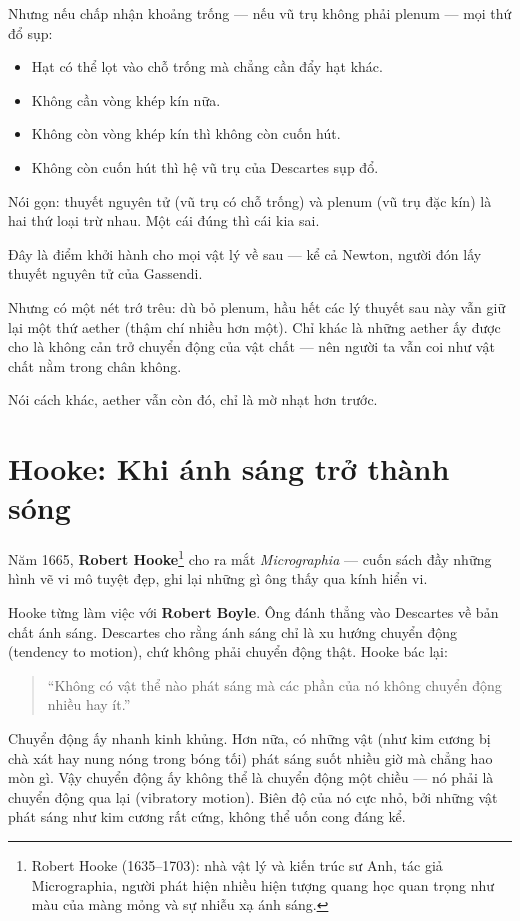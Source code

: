 Nhưng nếu chấp nhận khoảng trống — nếu vũ trụ không phải plenum — mọi thứ đổ sụp:

\begin{itemize}
  \item Hạt có thể lọt vào chỗ trống mà chẳng cần đẩy hạt khác.
  \item Không cần vòng khép kín nữa.
  \item Không còn vòng khép kín thì không còn cuốn hút.
  \item Không còn cuốn hút thì hệ vũ trụ của Descartes sụp đổ.
\end{itemize}

Nói gọn: thuyết nguyên tử (vũ trụ có chỗ trống) và plenum (vũ trụ đặc kín) là hai thứ loại trừ nhau. Một cái đúng thì cái kia sai.

Đây là điểm khởi hành cho mọi vật lý về sau — kể cả Newton, người đón lấy thuyết nguyên tử của Gassendi.

Nhưng có một nét trớ trêu: dù bỏ plenum, hầu hết các lý thuyết sau này vẫn giữ lại một thứ aether (thậm chí nhiều hơn một). Chỉ khác là những aether ấy được cho là không cản trở chuyển động của vật chất — nên người ta vẫn coi như vật chất nằm trong chân không.

Nói cách khác, aether vẫn còn đó, chỉ là mờ nhạt hơn trước.


\section{Hooke: Khi ánh sáng trở thành sóng}

Năm 1665, \textbf{Robert Hooke}\footnote{Robert Hooke (1635--1703): nhà vật lý và kiến trúc sư Anh, tác giả Micrographia, người phát hiện nhiều hiện tượng quang học quan trọng như màu của màng mỏng và sự nhiễu xạ ánh sáng.} cho ra mắt \emph{Micrographia} — cuốn sách đầy những hình vẽ vi mô tuyệt đẹp, ghi lại những gì ông thấy qua kính hiển vi.

Hooke từng làm việc với \textbf{Robert Boyle}. Ông đánh thẳng vào Descartes về bản chất ánh sáng. Descartes cho rằng ánh sáng chỉ là xu hướng chuyển động (tendency to motion), chứ không phải chuyển động thật. Hooke bác lại:

\begin{quote}
“Không có vật thể nào phát sáng mà các phần của nó không chuyển động nhiều hay ít.”
\end{quote}

Chuyển động ấy nhanh kinh khủng. Hơn nữa, có những vật (như kim cương bị chà xát hay nung nóng trong bóng tối) phát sáng suốt nhiều giờ mà chẳng hao mòn gì. Vậy chuyển động ấy không thể là chuyển động một chiều — nó phải là chuyển động qua lại (vibratory motion). Biên độ của nó cực nhỏ, bởi những vật phát sáng như kim cương rất cứng, không thể uốn cong đáng kể.


